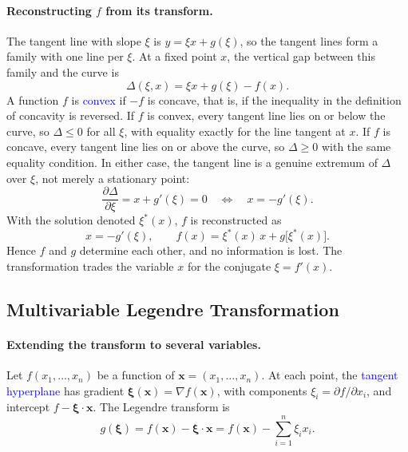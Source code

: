 \paragraph{Reconstructing $f$ from its transform.}
The tangent line with slope $\xi$ is $y=\xi x+g(\xi)$, so the tangent lines
form a family with one line per $\xi$. At a fixed point $x$, the vertical
gap between this family and the curve is
\begin{equation*}
    \Delta(\xi,x)=\xi x+g(\xi)-f(x).
\end{equation*}
A function $f$ is \textcolor{blue}{convex} if $-f$ is concave, that is, if
the inequality in the definition of concavity is reversed. If $f$ is convex,
every tangent line lies on or below the curve, so $\Delta\leq0$ for all
$\xi$, with equality exactly for the line tangent at $x$. If $f$ is concave,
every tangent line lies on or above the curve, so $\Delta\geq0$ with the same
equality condition. In either case, the tangent line is a genuine extremum of
$\Delta$ over $\xi$, not merely a stationary point:
\begin{equation*}
    \frac{\partial\Delta}{\partial\xi}=x+g'(\xi)=0
    \quad\Longleftrightarrow\quad x=-g'(\xi).
\end{equation*}
With the solution denoted $\xi^*(x)$, $f$ is reconstructed as
\begin{equation}
    \boxed{x=-g'(\xi),\qquad f(x)=\xi^*(x)\,x+g\big[\xi^*(x)\big].}
\end{equation}
Hence $f$ and $g$ determine each other, and no information is lost. The
transformation trades the variable $x$ for the conjugate $\xi=f'(x)$.

\subsection{Multivariable Legendre Transformation}

\paragraph{Extending the transform to several variables.}
Let $f(x_1,\ldots,x_n)$ be a function of $\mathbf{x}=(x_1,\ldots,x_n)$. At
each point, the \textcolor{blue}{tangent hyperplane} has gradient
$\boldsymbol{\xi}(\mathbf{x})=\nabla f(\mathbf{x})$, with components
$\xi_i=\partial f/\partial x_i$, and intercept $f-\boldsymbol{\xi}\cdot\mathbf{x}$.
The Legendre transform is
\begin{equation}
    \boxed{g(\boldsymbol{\xi})
    = f(\mathbf{x})-\boldsymbol{\xi}\cdot\mathbf{x}
    = f(\mathbf{x})-\sum_{i=1}^n\xi_i x_i.}
\end{equation}

